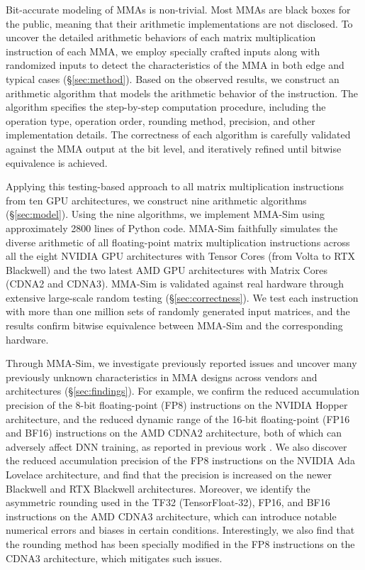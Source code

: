 Bit-accurate modeling of MMAs is non-trivial. Most MMAs are black boxes for the public, meaning that their arithmetic implementations are not disclosed. To uncover the detailed arithmetic behaviors of each matrix multiplication instruction of each MMA, we employ specially crafted inputs along with randomized inputs to detect the characteristics of the MMA in both edge and typical cases (\S\ref{sec:method}). Based on the observed results, we construct an arithmetic algorithm that models the arithmetic behavior of the instruction. The algorithm specifies the step-by-step computation procedure, including the operation type, operation order, rounding method, precision, and other implementation details. The correctness of each algorithm is carefully validated against the MMA output at the bit level, and iteratively refined until bitwise equivalence is achieved.

Applying this testing-based approach to all matrix multiplication instructions from ten GPU architectures, we construct nine arithmetic algorithms (\S\ref{sec:model}). Using the nine algorithms, we implement MMA-Sim using approximately 2800 lines of Python code. MMA-Sim faithfully simulates the diverse arithmetic of all floating-point matrix multiplication instructions across all the eight NVIDIA GPU architectures with Tensor Cores (from Volta to RTX Blackwell) and the two latest AMD GPU architectures with Matrix Cores (CDNA2 and CDNA3). MMA-Sim is validated against real hardware through extensive large-scale random testing (\S\ref{sec:correctness}). We test each instruction with more than one million sets of randomly generated input matrices, and the results confirm bitwise equivalence between MMA-Sim and the corresponding hardware.

Through MMA-Sim, we investigate previously reported issues and uncover many previously unknown characteristics in MMA designs across vendors and architectures (\S\ref{sec:findings}). For example, we confirm the reduced accumulation precision of the 8-bit floating-point (FP8) instructions on the NVIDIA Hopper architecture, and the reduced dynamic range of the 16-bit floating-point (FP16 and BF16) instructions on the AMD CDNA2 architecture, both of which can adversely affect DNN training, as reported in previous work \cite{deepseek-ai_deepseek-v3_2024,pytorch_developers_pytorch_2025}. We also discover the reduced accumulation precision of the FP8 instructions on the NVIDIA Ada Lovelace architecture, and find that the precision is increased on the newer Blackwell and RTX Blackwell architectures. Moreover, we identify the asymmetric rounding used in the TF32 (TensorFloat-32), FP16, and BF16 instructions on the AMD CDNA3 architecture, which can introduce notable numerical errors and biases in certain conditions. Interestingly, we also find that the rounding method has been specially modified in the FP8 instructions on the CDNA3 architecture, which mitigates such issues.

